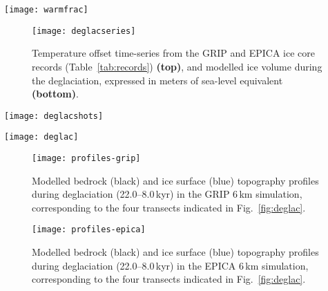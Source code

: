 \documentclass[tc, manuscript]{copernicus}
\newcommand{\todo}[1]{\emph{[\textbf{Todo:} #1]}}
\begin{document}
\begin{figure*}
  \texttt{[image: warmfrac]}
  \caption{Modelled fraction of warm-based ice cover during the ice-covered
           period. Note the dominance of warm-based conditions on the
           continental shelf and major glacial troughs of the coastal ranges.
           Hatches indicate areas that were covered by cold ice only.
           \todo{indicate location of the Skeena Mountains.}}
  \label{fig:warmfrac}
\end{figure*}

\begin{figure}
  \texttt{[image: deglacseries]}
  \caption{Temperature offset time-series from the GRIP and EPICA ice core
           records (Table~\ref{tab:records}) \textbf{(top)}, and modelled ice
           volume during the deglaciation, expressed in meters of sea-level
           equivalent \textbf{(bottom)}.}
  \label{fig:deglacseries}
\end{figure}

\begin{figure*}
  \texttt{[image: deglacshots]}
  \caption{Snapshots of modelled surface topography (200\,m contours)
           and surface velocity (colour mapping) during the last deglaciation
           from the GRIP (top panels) and EPICA (bottom panels) simulations.}
  \label{fig:deglacshots-grip}
\end{figure*}

\begin{figure*}
  \texttt{[image: deglac]}
  \caption{Modelled age of the last deglaciation. Areas where the MIS~4 glacial
           advance exceeded the last glacial maximum advanced are marked in
           green. Hatches denote re-advance of mountain-centred ice caps and
           and the decaying ice sheet between 14 and 10\,kyr., which is more
           pronounced in the GRIP-driven simulation.}
  \label{fig:deglac}
\end{figure*}

\begin{figure}
  \texttt{[image: profiles-grip]}
  \caption{Modelled bedrock (black) and ice surface (blue) topography profiles
           during deglaciation (22.0--8.0\,kyr) in the GRIP 6\,km
           simulation, corresponding to the four transects indicated in
           Fig.~\ref{fig:deglac}.}
  \label{fig:profiles-grip}
\end{figure}

\begin{figure}
  \texttt{[image: profiles-epica]}
  \caption{Modelled bedrock (black) and ice surface (blue) topography profiles
           during deglaciation (22.0--8.0\,kyr) in the EPICA 6\,km
           simulation, corresponding to the four transects indicated in
           Fig.~\ref{fig:deglac}.}
  \label{fig:profiles-epica}
\end{figure}
\end{document}
